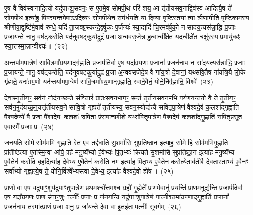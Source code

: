 ए॒ष वै विव॑स्वानादि॒त्यो यदु॑पाꣳशु॒सव॑नः॒ स ए॒तमे॒व सो॑मपी॒थं परि॑ शय॒ आ तृ॑तीयसव॒नाद्विव॑स्व आदित्यै॒ष ते॑ सोमपी॒थ इत्या॑ह॒ विव॑स्वन्तमे॒वाऽऽदि॒त्यꣳ सो॑मपी॒थेन॒ सम॑र्धयति॒ या दि॒व्या वृष्टि॒स्तया᳚ त्वा श्रीणा॒मीति॒ वृष्टि॑कामस्य श्रीणीया॒द्वृष्टि॑मे॒वाव॑ रुन्धे॒ यदि॑ ता॒जक्प्र॒स्कन्दे॒द्वर्\mbox{}षु॑कः प॒र्जन्यः॑ स्या॒द्यदि॑ चि॒रमव॑र्\mbox{}षुको॒ न सा॑दय॒त्यस॑न्ना॒द्धि प्र॒जाः प्र॒जाय॑न्ते॒ नानु॒ वष॑ट्करोति॒ यद॑नुवषट्कु॒॒र्याद्रु॒द्रं प्र॒जा अ॒न्वव॑सृजे॒न्न हु॒त्वान्वी᳚क्षेत॒ यद॒न्वीक्षे॑त॒ चक्षु॑रस्य प्र॒मायु॑कꣴ स्या॒त्तस्मा॒न्नान्वीक्ष्यः॑॥~(२२)

{\anuvakamend[{ए॒व य॒ज्ञाज्ज॒रायु॒ तदे॒व तद॒न्तर्द॑धाति॒ न स॒प्तविꣳ॑शतिश्च}]}%

अ॒न्त॒र्या॒म॒पा॒त्रेण॑ सावि॒त्रमा᳚ग्रय॒णाद्गृ॑ह्णाति प्र॒जा\-प॑ति॒र्वा ए॒ष यदा᳚ग्रय॒णः प्र॒जानां᳚ प्र॒जन॑नाय॒ न सा॑दय॒त्यस॑न्ना॒द्धि प्र॒जाः प्र॒जाय॑न्ते॒ नानु॒ वष॑ट्करोति॒ यद॑नुवषट्कु॒र्याद्रु॒द्रं प्र॒जा अ॒न्वव॑सृजेदे॒ष वै गा॑य॒त्रो दे॒वानां॒ यथ्स॑वि॒तैष गा॑यत्रि॒यै लो॒के गृ॑ह्यते॒ यदा᳚ग्रय॒णो यद॑न्तर्यामपा॒त्रेण॑ सावि॒त्रमा᳚ग्रय॒णाद्गृ॒ह्णाति॒ स्वादे॒वैनं॒ योने॒र्निर्गृ॑ह्णाति॒ विश्वे᳚~(२३)

दे॒वास्तृ॒तीय॒ꣳ॒ सव॑नं॒ नोद॑यच्छ॒न्ते स॑वि॒तारं॑ प्रातःसव॒नभा॑ग॒ꣳ॒ सन्तं॑ तृतीयसव॒नम॒भि पर्य॑णय॒न्ततो॒ वै ते तृ॒तीय॒ꣳ॒ सव॑न॒मुद॑यच्छ॒न्॒यत्तृ॑तीयसव॒ने सा॑वि॒त्रो गृ॒ह्यते॑ तृ॒तीय॑स्य॒ सव॑न॒स्योद्य॑त्यै सवितृपा॒त्रेण॑ वैश्वदे॒वं क॒लशा᳚द्गृह्णाति वैश्वदे॒व्यो॑ वै प्र॒जा वै᳚श्वदे॒वः क॒लशः॑ सवि॒ता प्र॑स॒वाना॑मीशे॒ यथ्स॑वितृपा॒त्रेण॑ वैश्वदे॒वं क॒लशा᳚द्गृ॒ह्णाति॑ सवि॒तृप्र॑सूत ए॒वास्मै᳚ प्र॒जाः प्र~(२४)

ज॒न॒य॒ति॒ सोमे॒ सोम॑म॒भि गृ॑ह्णाति॒ रेत॑ ए॒व तद्द॑धाति सु॒शर्मा॑सि सुप्रतिष्ठा॒न इत्या॑ह॒ सोमे॒ हि सोम॑मभिगृ॒ह्णाति॒ प्रति॑ष्ठित्या ए॒तस्मि॒न्वा अपि॒ ग्रहे॑ मनु॒ष्ये᳚भ्यो दे॒वेभ्यः॑ पि॒तृभ्यः॑ क्रियते सु॒शर्मा॑सि सुप्रतिष्ठा॒न इत्या॑ह मनु॒ष्ये᳚भ्य ए॒वैतेन॑ करोति बृ॒हदित्या॑ह दे॒वेभ्य॑ ए॒वैतेन॑ करोति॒ नम॒ इत्या॑ह पि॒तृभ्य॑ ए॒वैतेन॑ करोत्ये॒ताव॑ती॒र्वै दे॒वता॒स्ताभ्य॑ ए॒वैन॒ꣳ॒ सर्वा᳚भ्यो गृह्णात्ये॒ष ते॒ योनि॒र्विश्वे᳚भ्यस्त्वा दे॒वेभ्य॒ इत्या॑ह वैश्वदे॒वो ह्ये॑षः॥~(२५)

{\anuvakamend[{विश्वे॒ प्र पि॒तृभ्य॑ ए॒वैतेन॑ करो॒त्येका॒न्नविꣳ॑श॒तिश्च॑}]}%

प्रा॒णो वा ए॒ष यदु॑पा॒ꣳ॒शुर्यदु॑पाꣳशुपा॒त्रेण॑ प्रथ॒मश्चो᳚त्त॒मश्च॒ ग्रहौ॑ गृ॒ह्येते᳚ प्रा॒णमे॒वानु॑ प्र॒यन्ति॑ प्रा॒णमनूद्य॑न्ति प्र॒जा\-प॑ति॒र्वा ए॒ष यदा᳚ग्रय॒णः प्रा॒ण उ॑पा॒ꣳ॒शुः पत्नीः᳚ प्र॒जाः प्र ज॑नयन्ति॒ यदु॑पाꣳशुपा॒त्रेण॑ पात्नीव॒तमा᳚ग्रय॒णाद्गृ॒ह्णाति॑ प्र॒जानां᳚ प्र॒जन॑नाय॒ तस्मा᳚त्प्रा॒णं प्र॒जा अनु॒ प्र जा॑यन्ते दे॒वा वा इ॒तइ॑तः॒ पत्नीः᳚ सुव॒र्गम्~(२६)

